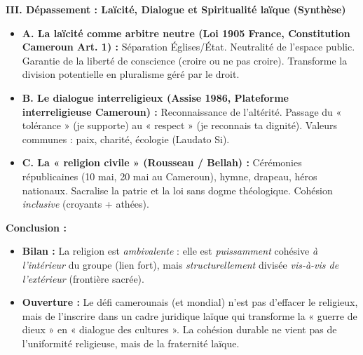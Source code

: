 \documentclass[11pt]{article}
\newcommand{\cle}[1]{{\popxbold\color{popdark}#1}}
\begin{document}
\begin{exoresolu}
\textbf{III. Dépassement : Laïcité, Dialogue et Spiritualité laïque (Synthèse)}
\begin{itemize}
    \item \textbf{A. La laïcité comme arbitre neutre (Loi 1905 France, Constitution Cameroun Art. 1) :} Séparation Églises/État. Neutralité de l'espace public. Garantie de la \cle{liberté de conscience} (croire ou ne pas croire). Transforme la division potentielle en \cle{pluralisme} géré par le droit.
    \item \textbf{B. Le dialogue interreligieux (Assise 1986, Plateforme interreligieuse Cameroun) :} Reconnaissance de l'altérité. Passage du « tolérance » (je supporte) au « respect » (je reconnais ta dignité). Valeurs communes : paix, charité, écologie (Laudato Si).
    \item \textbf{C. La « religion civile » (Rousseau / Bellah) :} Cérémonies républicaines (10 mai, 20 mai au Cameroun), hymne, drapeau, héros nationaux. Sacralise la \cle{patrie} et la \cle{loi} sans dogme théologique. Cohésion \emph{inclusive} (croyants + athées).
\end{itemize}

\textbf{Conclusion :}
\begin{itemize}
    \item \textbf{Bilan :} La religion est \emph{ambivalente} : elle est \emph{puissamment} cohésive \emph{à l'intérieur} du groupe (lien fort), mais \emph{structurellement} divisée \emph{vis-à-vis de l'extérieur} (frontière sacrée).
    \item \textbf{Ouverture :} Le défi camerounais (et mondial) n'est pas d'effacer le religieux, mais de l'inscrire dans un \cle{cadre juridique laïque} qui transforme la « guerre de dieux » en « dialogue des cultures ». La cohésion durable ne vient pas de l'uniformité religieuse, mais de la \cle{fraternité laïque}.
\end{itemize}
\end{exoresolu}
\end{document}
